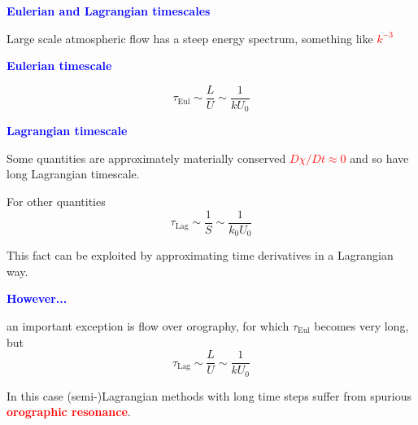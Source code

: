 \documentclass[a4]{seminar}
\newcommand{\R}[1]{\textcolor{red}{#1}}
\newcommand{\B}[1]{\textcolor{blue}{#1}}
\begin{document}

\begin{slide}

\B{\bf Eulerian and Lagrangian timescales}

\vspace{3mm}

\begin{center}
\end{center}

\end{slide}


\begin{slide}

Large scale atmospheric flow has a steep energy spectrum, something like
\R{\( k^{-3}\)}

\B{\bf Eulerian timescale}

\begin{displaymath}
\tau_{\mathrm{Eul}} \sim \frac{L}{U} \sim \frac{1}{k U_0}
\end{displaymath}

\B{\bf Lagrangian timescale}

Some quantities are approximately materially conserved
\R{\( D \chi / Dt \approx 0 \)}
and so have long Lagrangian timescale.

For other quantities
\begin{displaymath}
\tau_{\mathrm{Lag}} \sim \frac{1}{S} \sim \frac{1}{k_0 U_0}
\end{displaymath}

\vspace{2mm}

This fact can be exploited by approximating time derivatives in a
Lagrangian way.

\end{slide}


\begin{slide}

\B{\bf However...}

an important exception is flow over orography, for which
\( \tau_{\mathrm{Eul}} \) becomes very long, but
\begin{displaymath}
\tau_{\mathrm{Lag}} \sim \frac{L}{U} \sim \frac{1}{k U_0}
\end{displaymath}

In this case (semi-)Lagrangian methods with long time steps
suffer from spurious \R{\bf orographic resonance}.


\end{slide}
\end{document}
